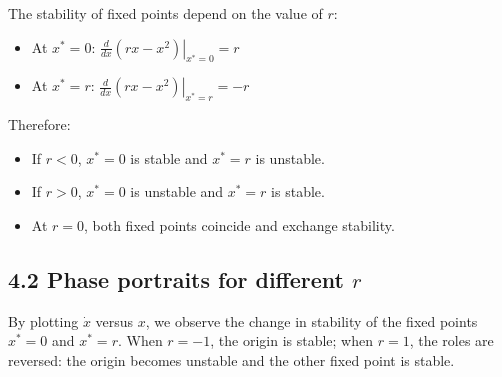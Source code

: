 \documentclass[
]{article}
\providecommand{\tightlist}{%
  \setlength{\itemsep}{0pt}\setlength{\parskip}{0pt}}
\begin{document}
The stability of fixed points depend on the value of \(r\):

\begin{itemize}
\tightlist
\item
  At \(x^* = 0\): \(\left.\frac{d}{dx}(rx - x^2)\right|_{x^*=0} = r\)
\item
  At \(x^* = r\): \(\left.\frac{d}{dx}(rx - x^2)\right|_{x^*=r} = -r\)
\end{itemize}

Therefore:

\begin{itemize}
\tightlist
\item
  If \(r < 0\), \(x^*=0\) is stable and \(x^*=r\) is unstable.
\item
  If \(r > 0\), \(x^*=0\) is unstable and \(x^*=r\) is stable.
\item
  At \(r=0\), both fixed points coincide and exchange stability.
\end{itemize}

\subsection{\texorpdfstring{\textbf{4.2 Phase portraits for different
\(r\)}}{4.2 Phase portraits for different r}}\label{phase-portraits-for-different-r-2}

By plotting \(\dot{x}\) versus \(x\), we observe the change in stability
of the fixed points \(x^*=0\) and \(x^*=r\). When \(r = -1\), the origin
is stable; when \(r = 1\), the roles are reversed: the origin becomes
unstable and the other fixed point is stable.
\end{document}
